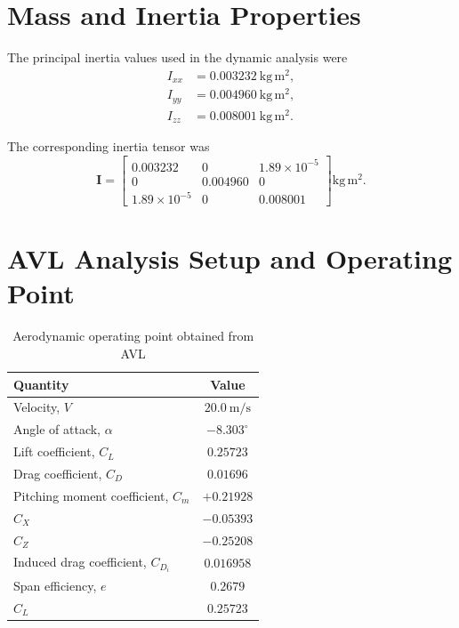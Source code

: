 \documentclass[11pt,a4paper]{article}
\begin{document}
\section{Mass and Inertia Properties}

The principal inertia values used in the dynamic analysis were
\begin{align}
I_{xx} &= 0.003232~\mathrm{kg\,m^2},\\
I_{yy} &= 0.004960~\mathrm{kg\,m^2},\\
I_{zz} &= 0.008001~\mathrm{kg\,m^2}.
\end{align}

The corresponding inertia tensor was
\begin{equation}
\mathbf{I}
=
\begin{bmatrix}
0.003232 & 0 & 1.89\times10^{-5}\\
0 & 0.004960 & 0\\
1.89\times10^{-5} & 0 & 0.008001
\end{bmatrix}
\mathrm{kg\,m^2}.
\end{equation}

\section{AVL Analysis Setup and Operating Point}


\begin{table}[H]
\centering
\caption{Aerodynamic operating point obtained from AVL}
\label{tab:operating_point}
\begin{tabular}{lc}
\toprule
Quantity & Value \\
\midrule
Velocity, $V$ & $20.0~\mathrm{m/s}$ \\
Angle of attack, $\alpha$ & $-8.303^\circ$ \\
Lift coefficient, $C_L$ & $0.25723$ \\
Drag coefficient, $C_D$ & $0.01696$ \\
Pitching moment coefficient, $C_m$ & $+0.21928$ \\
$C_X$ & $-0.05393$ \\
$C_Z$ & $-0.25208$ \\
Induced drag coefficient, $C_{D_i}$ & $0.016958$ \\
Span efficiency, $e$ & $0.2679$ \\
$C_L$ & $0.25723$ \\
\bottomrule
\end{tabular}
\end{table}
\end{document}
